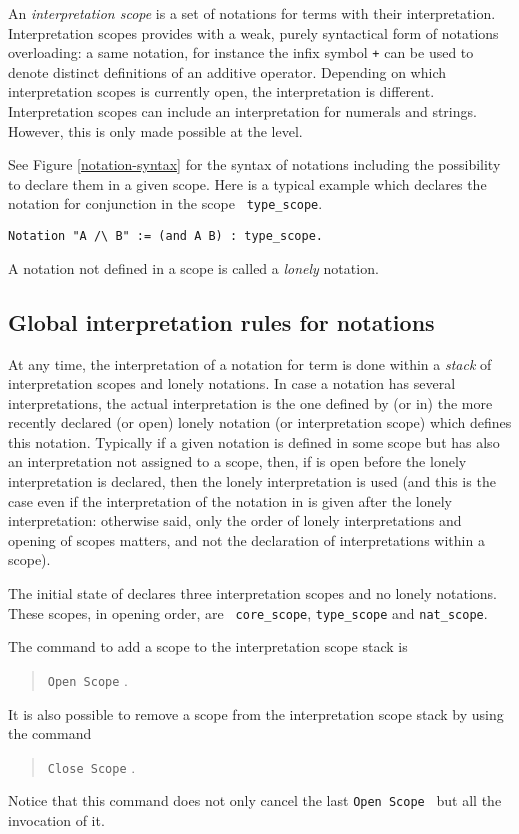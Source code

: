An {\em interpretation scope} is a set of notations for terms with
their interpretation. Interpretation scopes provides with a weak,
purely syntactical form of notations overloading: a same notation, for
instance the infix symbol \verb=+= can be used to denote distinct
definitions of an additive operator. Depending on which interpretation
scopes is currently open, the interpretation is different.
Interpretation scopes can include an interpretation for
numerals and strings. However, this is only made possible at the
{\ocaml} level.

See Figure \ref{notation-syntax} for the syntax of notations including
the possibility to declare them in a given scope.  Here is a typical
example which declares the notation for conjunction in the scope {\tt
type\_scope}.

\begin{verbatim}
Notation "A /\ B" := (and A B) : type_scope.
\end{verbatim}

\Rem A notation not defined in a scope is called a {\em lonely} notation.

\subsection{Global interpretation rules for notations}

At any time, the interpretation of a notation for term is done within
a {\em stack} of interpretation scopes and lonely notations. In case a
notation has several interpretations, the actual interpretation is the
one defined by (or in) the more recently declared (or open) lonely
notation (or interpretation scope) which defines this notation.
Typically if a given notation is defined in some scope {\scope} but
has also an interpretation not assigned to a scope, then, if {\scope}
is open before the lonely interpretation is declared, then the lonely
interpretation is used (and this is the case even if the
interpretation of the notation in {\scope} is given after the lonely
interpretation: otherwise said, only the order of lonely
interpretations and opening of scopes matters, and not the declaration
of interpretations within a scope).

The initial state of {\Coq} declares three interpretation scopes and
no lonely notations. These scopes, in opening order, are {\tt
core\_scope}, {\tt type\_scope} and {\tt nat\_scope}.

The command to add a scope to the interpretation scope stack is
\begin{quote}
{\tt Open Scope} {\scope}.
\end{quote}
It is also possible to remove a scope from the interpretation scope
stack by using the command
\begin{quote}
{\tt Close Scope} {\scope}.
\end{quote}
Notice that this command does not only cancel the last {\tt Open Scope
{\scope}} but all the invocation of it.

